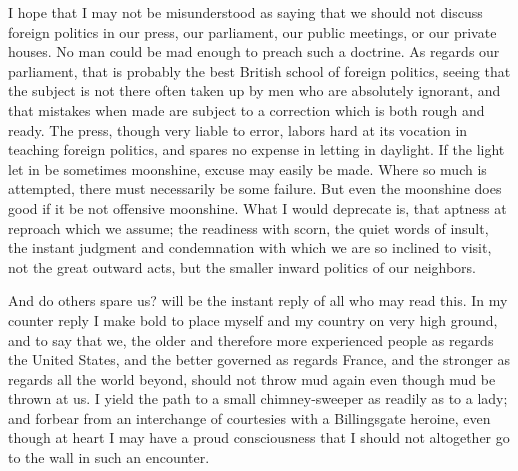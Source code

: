 I hope that I may not be misunderstood as saying that we should not
discuss foreign politics in our press, our parliament, our public
meetings, or our private houses.  No man could be mad enough to
preach such a doctrine.  As regards our parliament, that is
probably the best British school of foreign politics, seeing that
the subject is not there often taken up by men who are absolutely
ignorant, and that mistakes when made are subject to a correction
which is both rough and ready.  The press, though very liable to
error, labors hard at its vocation in teaching foreign politics,
and spares no expense in letting in daylight.  If the light let in
be sometimes moonshine, excuse may easily be made.  Where so much
is attempted, there must necessarily be some failure.  But even the
moonshine does good if it be not offensive moonshine.  What I would
deprecate is, that aptness at reproach which we assume; the
readiness with scorn, the quiet words of insult, the instant
judgment and condemnation with which we are so inclined to visit,
not the great outward acts, but the smaller inward politics of our
neighbors.

And do others spare us? will be the instant reply of all who may
read this.  In my counter reply I make bold to place myself and my
country on very high ground, and to say that we, the older and
therefore more experienced people as regards the United States, and
the better governed as regards France, and the stronger as regards
all the world beyond, should not throw mud again even though mud be
thrown at us.  I yield the path to a small chimney-sweeper as
readily as to a lady; and forbear from an interchange of courtesies
with a Billingsgate heroine, even though at heart I may have a
proud consciousness that I should not altogether go to the wall in
such an encounter.

